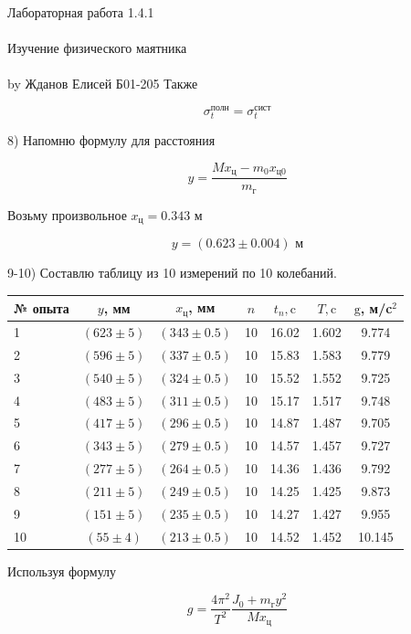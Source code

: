 \documentclass{astroedu-lab}
\begin{document}
\begin{problem}{\huge Лабораторная работа 1.4.1\\\\Изучение физического маятника\\\\by Жданов Елисей Б01-205}
Также

\begin{equation}
	\sigma_{t}^{\text {полн}} = \sigma_{t}^{\text {сист}}
\end{equation}

8) Напомню формулу для расстояния

\begin{equation}
	y=\frac{M x_{\text{ц}}-m_{0} x_{\text{ц} 0}}{m_{\text{г}}}
\end{equation}

Возьму произвольное $x_{\text{ц}} = 0.343 \text{ м}$

\begin{equation}
	y = (0.623 \pm 0.004) \text{ м}
\end{equation}

9-10) Составлю таблицу из 10 измерений по 10 колебаний.

\begin{center}
\begin{tabular}{|l|c|c|c|c|c|c|}
\hline № опыта & \(y\), мм & \(x_{\text {ц}}\), мм  & \(n\) & \(t_{n}, \mathrm{c}\) & \(T, \mathrm{c}\) & \(\mathrm{g}\), м/c$^2$ \\ \hline
1 & $(623 \pm 5)$ & $(343 \pm 0.5)$ & 10 & 16.02 & 1.602 & 9.774 \\ \hline
2 & $(596 \pm 5)$ & $(337 \pm 0.5)$ & 10 & 15.83 & 1.583 & 9.779 \\ \hline
3 & $(540 \pm 5)$ & $(324 \pm 0.5)$ & 10 & 15.52 & 1.552 & 9.725 \\ \hline
4 & $(483 \pm 5)$ & $(311 \pm 0.5)$ & 10 & 15.17 & 1.517 & 9.748 \\ \hline
5 & $(417 \pm 5)$ & $(296 \pm 0.5)$ & 10 & 14.87 & 1.487 & 9.705 \\ \hline
6 & $(343 \pm 5)$ & $(279 \pm 0.5)$ & 10 & 14.57 & 1.457 & 9.727 \\ \hline
7 & $(277 \pm 5)$ & $(264 \pm 0.5)$ & 10 & 14.36 & 1.436 & 9.792 \\ \hline
8 & $(211 \pm 5)$ & $(249 \pm 0.5)$ & 10 & 14.25 & 1.425 & 9.873 \\ \hline
9 & $(151 \pm 5)$ & $(235 \pm 0.5)$ & 10 & 14.27 & 1.427 & 9.955 \\ \hline
10 & $(55 \pm 4)$ & $(213 \pm 0.5)$ & 10 & 14.52 & 1.452 & 10.145 \\ \hline
\end{tabular}
\end{center}

Используя формулу

\begin{equation}
	g = \frac{4\pi^2}{T^2} \frac{J_{0}+m_{\text{г}} y^{2}}{M x_{\text{ц}}}
\end{equation}


\end{problem}
\end{document}
